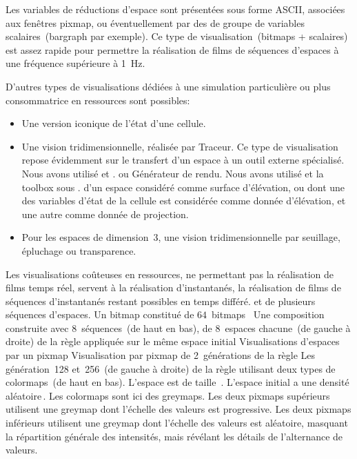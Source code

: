 Les variables de réductions d'espace sont présentées sous forme ASCII,
associées aux fenêtres pixmap, ou éventuellement par des
de groupe de variables scalaires~(bargraph par exemple). %
Ce type de visualisation~(bitmaps + scalaires) est assez rapide pour
permettre la réalisation de films de séquences d'espaces à une
fréquence supérieure à 1~Hz.

D'autres types de visualisations dédiées à une simulation particulière
ou plus consommatrice en ressources sont possibles:
\begin{itemize}
\item Une version iconique de l'état d'une cellule.
\item Une vision tridimensionnelle, réalisée par %
  {Traceur. Ce type de visualisation repose évidemment sur le
    transfert d'un espace à un outil externe spécialisé. %
    Nous avons utilisé  et .} %
   ou %
  {Générateur de rendu. Nous avons utilisé  et la toolbox
     sous .} %
   d'un espace considéré comme surface
  d'élévation, ou dont une des variables d'état de la cellule est
  considérée comme donnée d'élévation, et une autre comme donnée de
  projection.
\item Pour les espaces de dimension~3, une vision tridimensionnelle
  par seuillage, épluchage ou transparence.
\end{itemize}
Les visualisations coûteuses en ressources, ne permettant pas la
réalisation de films temps réel, servent à la réalisation
d'instantanés, la réalisation de films de séquences d'instantanés
restant possibles en temps différé.
%
{et de plusieurs séquences d'espaces.}%
{Un bitmap constitué de $64$~bitmaps~}%
{Une composition construite avec 8~séquences~(de haut en bas), de
  8~espaces chacune~(de gauche à droite) de la règle
 appliquée sur le même espace initial}
%
{Visualisations d'espaces par un pixmap}
{Visualisation par pixmap de 2~générations de la règle }%
{Les génération~128 et~256~(de gauche à droite) de la règle
   utilisant deux types de colormaps~(de haut en bas). %
  L'espace est de taille~. %
  L'espace initial a une densité aléatoire\,\Sundemi. %
  Les colormaps sont ici des greymaps. %
  Les deux pixmaps supérieurs utilisent une greymap dont l'échelle des
  valeurs est progressive. %
  Les deux pixmaps inférieurs utilisent une greymap dont l'échelle des
  valeurs est aléatoire, masquant la répartition générale des
  intensités, mais révélant les détails de l'alternance
  de valeurs.}
